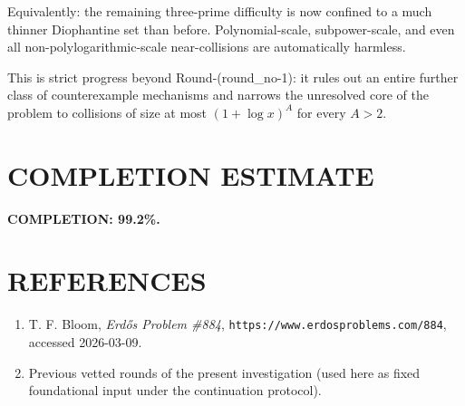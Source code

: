 Equivalently: the remaining three-prime difficulty is now confined to a much thinner Diophantine set than before. Polynomial-scale, subpower-scale, and even all non-polylogarithmic-scale near-collisions are automatically harmless.

This is strict progress beyond Round-(round\_no-1): it rules out an entire further class of counterexample mechanisms and narrows the unresolved core of the problem to collisions of size at most \((1+\log x)^A\) for every \(A>2\).

\section{COMPLETION ESTIMATE}

\noindent \textbf{COMPLETION: 99.2\%.}

\section{REFERENCES}

\begin{enumerate}
\item T. F. Bloom, \emph{Erd\H{o}s Problem \#884}, \texttt{https://www.erdosproblems.com/884}, accessed 2026-03-09.
\item Previous vetted rounds of the present investigation (used here as fixed foundational input under the continuation protocol).
\end{enumerate}

